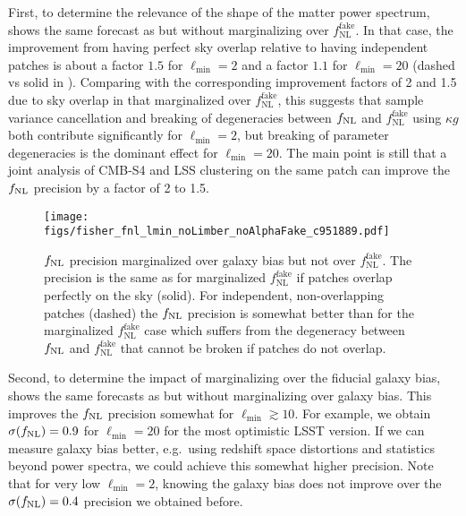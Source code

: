\documentclass[prd,superscriptaddress,floatfix,notitlepage,nofootinbib,reprint]{revtex4-1} %
\begin{document}
First, to determine the relevance of the shape of the matter power spectrum,  shows the same forecast as  but without marginalizing over $f_\mathrm{NL}^\mathrm{fake}$. 
In that case, the improvement from having perfect sky overlap relative to having independent patches is about a factor $1.5$ for $\ell_\mathrm{min}=2$ and a factor $1.1$ for $\ell_\mathrm{min}=20$ (dashed vs solid in ).
Comparing with the corresponding improvement factors of 2 and 1.5 due to sky overlap in  that marginalized over $f_\mathrm{NL}^\mathrm{fake}$, this suggests that sample variance cancellation and breaking of degeneracies between ${f_\mathrm{NL}}$ and $f_\mathrm{NL}^\mathrm{fake}$ using $\kappa g$ both contribute significantly for $\ell_\mathrm{min}=2$, but breaking of parameter degeneracies is the dominant effect for $\ell_\mathrm{min}=20$. 
The main point is still that a joint analysis of CMB-S4 and LSS clustering on the same patch can improve the ${f_\mathrm{NL}}$ precision by a factor of 2 to 1.5.


\begin{figure}[tbp]
\texttt{[image: figs/fisher\_fnl\_lmin\_noLimber\_noAlphaFake\_c951889.pdf]}
\caption{${f_\mathrm{NL}}$ precision marginalized over galaxy bias but not over $f_\mathrm{NL}^\mathrm{fake}$.
The precision is the same as for marginalized $f_\mathrm{NL}^\mathrm{fake}$ if patches overlap perfectly on the sky (solid).
For independent, non-overlapping patches (dashed) the ${f_\mathrm{NL}}$ precision is somewhat better than for the marginalized $f_\mathrm{NL}^\mathrm{fake}$ case which suffers from the degeneracy between ${f_\mathrm{NL}}$ and $f_\mathrm{NL}^\mathrm{fake}$ that cannot be broken if patches do not overlap.
}
\label{fig:fnl_lmin_noFnlFake}
\end{figure}


Second, to determine the impact of marginalizing over the fiducial galaxy bias,  shows the same forecasts as  but without marginalizing over galaxy bias.
This improves the ${f_\mathrm{NL}}$ precision somewhat for $\ell_\mathrm{min}\gtrsim 10$. 
For example, we obtain $\sigma({f_\mathrm{NL}})=0.9$ for $\ell_\mathrm{min}=20$ for the most optimistic LSST version.
If we can measure galaxy bias better, e.g.~using redshift space distortions and statistics beyond power spectra, we could achieve this somewhat higher precision. 
Note that for very low $\ell_\mathrm{min}=2$, knowing the galaxy bias does not improve over the $\sigma({f_\mathrm{NL}})=0.4$ precision we obtained before.
\end{document}
